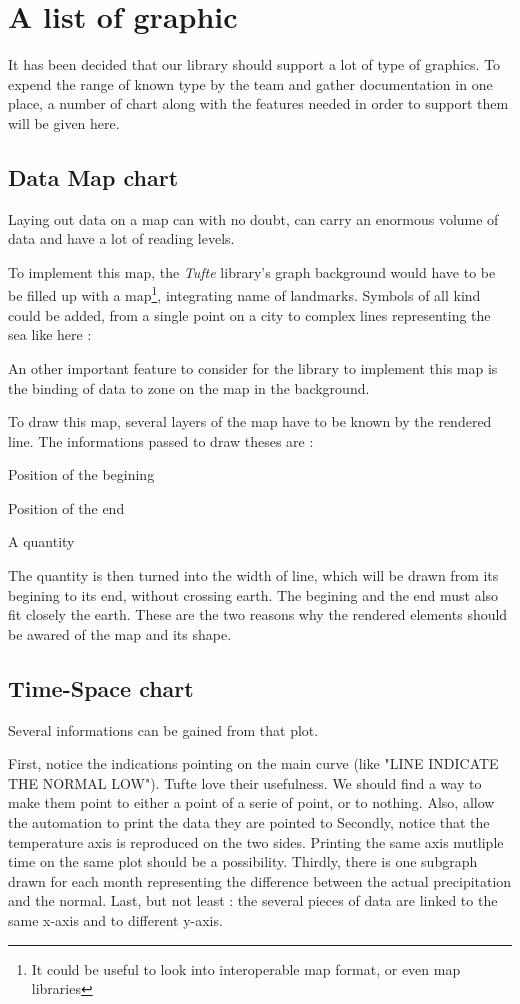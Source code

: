 \section{A list of graphic}
It has been decided that our library should support a lot of type of graphics. To expend the range of known type by the team and gather documentation in one place, a number of chart along with the features needed in order to support them will be given here.

\subsection{Data Map chart}
Laying out data on a map can with no doubt, can carry an enormous volume of data and have a lot of reading levels.

To implement this map, the \textit{Tufte} library's graph background would have to be be filled up with a map\footnote{It could be useful to look into interoperable map format, or even map libraries}, integrating name of landmarks. Symbols of all kind could be added, from a single point on a city to complex lines representing the sea like here :

An other important feature to consider for the library to implement this map is the binding of data to zone on the map in the background.

To draw this map, several layers of the map have to be known by the rendered line. The informations passed to draw theses are :
\begin{enum}
\item Position of the begining
\item Position of the end
\item A quantity
\end{enum}
The quantity is then turned into the width of line, which will be drawn from its begining to its end, without crossing earth.
The begining and the end must also fit closely the earth. These are the two reasons why the rendered elements should be awared of the map and its shape.

\subsection{Time-Space chart}
Several informations can be gained from that plot.

First, notice the indications pointing on the main curve (like "LINE INDICATE THE NORMAL LOW"). Tufte love their usefulness. We should find a way to make them point to either a point of a serie of point, or to nothing. Also, allow the automation to print the data they are pointed to
Secondly, notice that the temperature axis is reproduced on the two sides. Printing the same axis mutliple time on the same plot should be a possibility. 
Thirdly, there is one subgraph drawn for each month representing the difference between the actual precipitation and the normal.
Last, but not least : the several pieces of data are linked to the same x-axis and to different y-axis.

